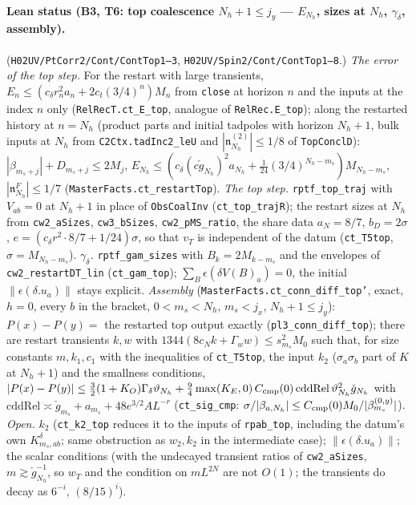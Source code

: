 \documentclass[11pt]{amsart}
\theoremstyle{definition}
\theoremstyle{remark}
\numberwithin{equation}{section}
\begin{document}
\paragraph{Lean status (B3, T6: top coalescence $N_h+1\le j_y$ --- $E_{N_h}$, sizes at $N_h$, $\gamma_\delta$, assembly).}
(\texttt{H02UV/PtCorr2/Cont/ContTop1--3}, \texttt{H02UV/Spin2/Cont/ContTop1--8}.) \emph{The error of the top step.} For the restart with large
transients, $E_n\le(c_\delta r_n^2a_n+2c_t(3/4)^n)M_n$ from \texttt{close} at horizon $n$ and the inputs at the index $n$
only (\texttt{RelRecT.ct\_E\_top}, analogue of \texttt{RelRec.E\_top}); along the restarted history at $n=N_h$ (product
parts and initial tadpoles with horizon $N_h+1$, bulk inputs at $N_h$ from \texttt{C2Ctx.tadInc2\_leU} and
$|\mathfrak n^{(2)}_{N_h}|\le1/8$ of \texttt{TopConclD}): $|\beta_{m_s+j}|+D_{m_s+j}\le2M_j$,
$E_{N_h}\le(c_\delta(c\check g_{N_h})^2a_{N_h}+\tfrac1{24}(3/4)^{N_h-m_s})M_{N_h-m_s}$, $|\mathfrak n^F_{N_h}|\le1/7$
(\texttt{MasterFacts.ct\_restartTop}). \emph{The top step.} \texttt{rptf\_top\_traj} with $V_{ab}=0$ at $N_h+1$ in place of
\texttt{ObsCoalInv} (\texttt{ct\_top\_trajR}); the restart sizes at $N_h$ from \texttt{cw2\_aSizes}, \texttt{cw3\_bSizes},
\texttt{cw2\_pMS\_ratio}, the share data $a_N=8/7$, $b_D=2\sigma$, $e=(c_\delta r^2\cdot8/7+1/24)\sigma$, so that $v_T$ is
independent of the datum (\texttt{ct\_T5top}, $\sigma=M_{N_h-m_s}$). \emph{$\gamma_\delta$.} \texttt{rptf\_gam\_sizes} with
$B_k=2M_{k-m_s}$ and the envelopes of \texttt{cw2\_restartDT\_lin} (\texttt{ct\_gam\_top}); $\sum_B\epsilon(\delta V(B)_a)=0$,
the initial $\|\epsilon(\delta.u_a)\|$ stays explicit. \emph{Assembly} (\texttt{MasterFacts.ct\_conn\_diff\_top'}, exact, $h=0$,
every $b$ in the bracket, $0<m_s<N_h$, $m_s<j_x$, $N_h+1\le j_y$): $P(x)-P(y)=$ the restarted top output exactly
(\texttt{pl3\_conn\_diff\_top}); there are restart transients $k,w$ with $1344(8c_Nk+\Gamma_ww)\le s_{m_s}^2M_0$ such that, for
size constants $m,k_1,c_1$ with the inequalities of \texttt{ct\_T5top}, the input $k_2$ ($\sigma_a\sigma_b$ part of $K$ at
$N_h+1$) and the smallness conditions,
$|P(x)-P(y)|\le\tfrac32(1+K_O)\Gamma_\delta\vartheta_{N_h}+\tfrac94\max(K_E,0)\,C_{\rm cmp}(0)\,\mathrm{cddRel}\,
\vartheta_{N_h}^2\check g_{N_h}$ with $\mathrm{cddRel}\asymp\check g_{m_s}+a_{m_s}+48e^{3/2}AL^{-r}$ (\texttt{ct\_sig\_cmp}:
$\sigma/|\beta_{a,N_h}|\le C_{\rm cmp}(0)M_0/|\beta^{(0,y)}_{m_s}|$). \emph{Open.} $k_2$ (\texttt{ct\_k2\_top} reduces it to
the inputs of \texttt{rpab\_top}, including the datum's own $K^\delta_{m_s,ab}$; same obstruction as $w_2,k_2$ in the
intermediate case); $\|\epsilon(\delta.u_a)\|$; the scalar conditions (with the undecayed transient ratios of
\texttt{cw2\_aSizes}, $m\gtrsim\check g_{N_h}^{-1}$, so $w_T$ and the condition on $mL^{2N}$ are not $O(1)$; the transients do
decay as $6^{-i}$, $(8/15)^i$).
\end{document}
